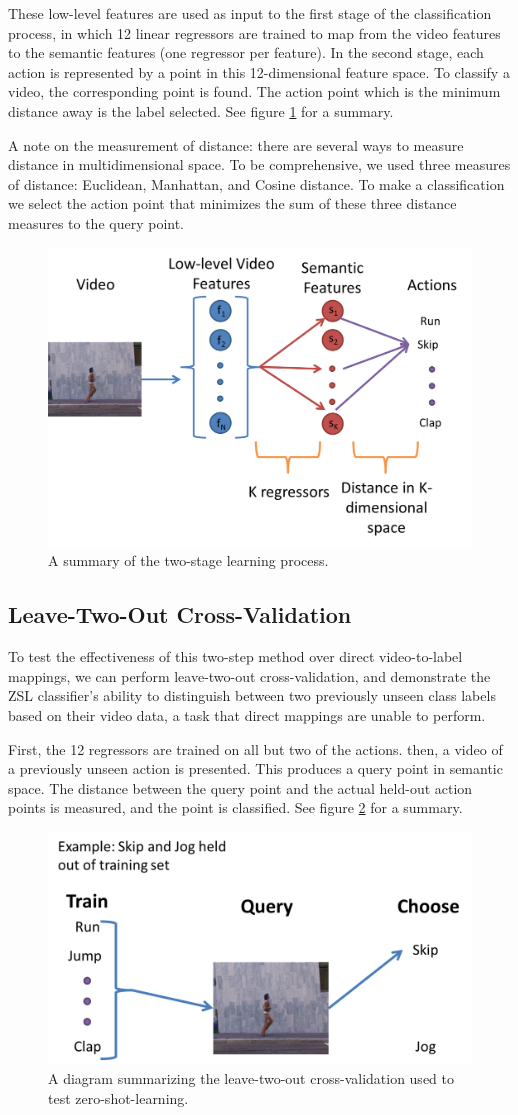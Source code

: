 \documentclass{article}
\begin{document}
These low-level features are used as input to the first stage of the classification process, in which 12 linear regressors are trained to map from the video features to the semantic features (one regressor per feature).  In the second stage, each action is represented by a point in this 12-dimensional feature space. To classify a video, the corresponding point is found. The action point which is the minimum distance away is the label selected. See figure \ref{2stage} for a summary.

A note on the measurement of distance: there are several ways to measure distance in multidimensional space. To be comprehensive, we used three measures of distance: Euclidean, Manhattan, and Cosine distance. To make a classification we select the action point that minimizes the sum of these three distance measures to the query point.
\begin{figure}[h]
\centering
\includegraphics[width=.4\linewidth]{2stagelearning.png}
\caption{A summary of the two-stage learning process.}
\label{2stage}
\end{figure}
\subsection{Leave-Two-Out Cross-Validation}
To test the effectiveness of this two-step method over direct video-to-label mappings, we can perform leave-two-out cross-validation, and demonstrate the ZSL classifier’s ability to distinguish between two previously unseen class labels based on their video data, a task that direct mappings are unable to perform.

First, the 12 regressors are trained on all but two of the actions.  then, a video of a previously unseen action is presented. This produces a query point in semantic space.  The distance between the query point and the actual held-out action points is measured, and the point is classified. See figure \ref{ltocv} for a summary.

\begin{figure}[h]
\centering
\includegraphics[width = .4\linewidth]{ltocv}
\caption{A diagram summarizing the leave-two-out cross-validation used to test zero-shot-learning.}
\label{ltocv}
\end{figure}
\end{document}
